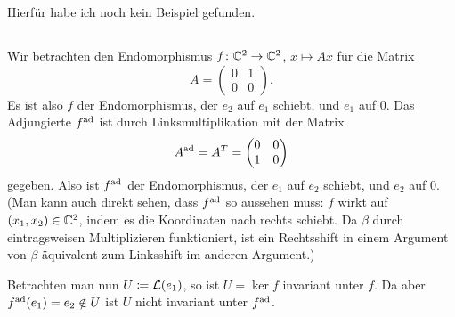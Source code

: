 \documentclass[a4paper,10pt,numbers=noenddot]{scrartcl}
\begin{document}
Hierfür habe ich noch kein Beispiel gefunden.





\subsection{}

Wir betrachten den Endomorphismus $f \colon \mathbb{C}^2 \to \mathbb{C}^2$, $x \mapsto Ax$ für die Matrix
\[
  A
  =
  \begin{pmatrix}
    0 & 1 \\
    0 & 0
  \end{pmatrix}.
\]
Es ist also $f$ der Endomorphismus, der $e_2$ auf $e_1$ schiebt, und $e_1$ auf $0$.
Das Adjungierte $f^{\mathrm{ad}}$ ist durch Linksmultiplikation mit der Matrix
\[
    A^{\mathrm{ad}}
  = A^T
  =
  \begin{pmatrix}
    0 & 0 \\
    1 & 0
  \end{pmatrix}
\]
gegeben.
Also ist $f^{\mathrm{ad}}$ der Endomorphismus, der $e_1$ auf $e_2$ schiebt, und $e_2$ auf $0$.
(Man kann auch direkt sehen, dass $f^{\mathrm{ad}}$ so aussehen muss:
$f$ wirkt auf $(x_1, x_2) \in \mathbb{C}^2$, indem es die Koordinaten nach rechts schiebt.
Da $\beta$ durch eintragsweisen Multiplizieren funktioniert, ist ein Rechtsshift in einem Argument von $\beta$ äquivalent zum Linksshift im anderen Argument.)

Betrachten man nun $U \coloneqq \operatorname{\mathcal{L}}(e_1)$, so ist $U = \ker f$ invariant unter $f$.
Da aber $f^{\mathrm{ad}}(e_1) = e_2 \notin U$ ist $U$ nicht invariant unter $f^{\mathrm{ad}}$.
\end{document}
